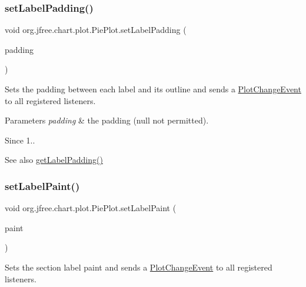 \subsubsection{\texorpdfstring{set\+Label\+Padding()}{setLabelPadding()}}
{\footnotesize\ttfamily void org.\+jfree.\+chart.\+plot.\+Pie\+Plot.\+set\+Label\+Padding (\begin{DoxyParamCaption}\item[{Rectangle\+Insets}]{padding }\end{DoxyParamCaption})}

Sets the padding between each label and its outline and sends a \mbox{\hyperlink{}{Plot\+Change\+Event}} to all registered listeners.


\begin{DoxyParams}{Parameters}
{\em padding} & the padding ({\ttfamily null} not permitted).\\
\hline
\end{DoxyParams}
\begin{DoxySince}{Since}
1..
\end{DoxySince}
\begin{DoxySeeAlso}{See also}
\mbox{\hyperlink{classorg_1_1jfree_1_1chart_1_1plot_1_1_pie_plot_af370c04b73e9e3f5b5aaa5e74dc8d9b3}{get\+Label\+Padding()}} 
\end{DoxySeeAlso}
\mbox{\label{classorg_1_1jfree_1_1chart_1_1plot_1_1_pie_plot_a941a98c8b83cf13669906ec888eb4f83}} 
\subsubsection{\texorpdfstring{set\+Label\+Paint()}{setLabelPaint()}}
{\footnotesize\ttfamily void org.\+jfree.\+chart.\+plot.\+Pie\+Plot.\+set\+Label\+Paint (\begin{DoxyParamCaption}\item[{Paint}]{paint }\end{DoxyParamCaption})}

Sets the section label paint and sends a \mbox{\hyperlink{}{Plot\+Change\+Event}} to all registered listeners.


